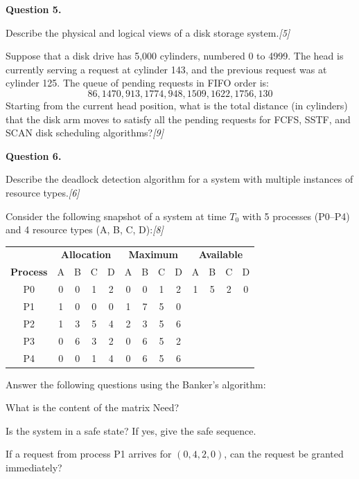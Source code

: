 \documentclass[11pt,a4paper]{article}
\newcommand{\pts}[1]{\hfill   \textit{[#1]}}
\begin{document}
\medskip


\noindent   \textbf{Question 5.}

\begin{parts}
  \item Describe the physical and logical views of a disk storage system.\pts{5}
  \item Suppose that a disk drive has 5,000 cylinders, numbered 0 to 4999. The head is currently serving a request at cylinder 143, and the previous request was at cylinder 125. The queue of pending requests in FIFO order is:
  \[ 86, 1470, 913, 1774, 948, 1509, 1622, 1756, 130 \]
  Starting from the current head position, what is the total distance (in cylinders) that the disk arm moves to satisfy all the pending requests for FCFS, SSTF, and SCAN disk scheduling algorithms?\pts{9}
\end{parts}

\medskip


\noindent   \textbf{Question 6.}

\begin{parts}
  \item Describe the deadlock detection algorithm for a system with multiple instances of resource types.\pts{6}
  \item Consider the following snapshot of a system at time $T_0$ with 5 processes (P0--P4) and 4 resource types (A, B, C, D):\pts{8}
  
\begin{center}
    
\begin{tabular}{|c|cccc|cccc|cccc|}
    \hline
    & \multicolumn{4}{c|}{   \textbf{Allocation}} & \multicolumn{4}{c|}{   \textbf{Maximum}} & \multicolumn{4}{c|}{   \textbf{Available}} \\
   \textbf{Process} & A & B & C & D & A & B & C & D & A & B & C & D \\
    \hline
    P0 & 0 & 0 & 1 & 2 & 0 & 0 & 1 & 2 & 1 & 5 & 2 & 0 \\
    P1 & 1 & 0 & 0 & 0 & 1 & 7 & 5 & 0 &   &   &   &   \\
    P2 & 1 & 3 & 5 & 4 & 2 & 3 & 5 & 6 &   &   &   &   \\
    P3 & 0 & 6 & 3 & 2 & 0 & 6 & 5 & 2 &   &   &   &   \\
    P4 & 0 & 0 & 1 & 4 & 0 & 6 & 5 & 6 &   &   &   &   \\
    \hline
    \end{tabular}
  \end{center}
  Answer the following questions using the Banker's algorithm:
  
\begin{parts}
    \item What is the content of the matrix Need?
    \item Is the system in a safe state? If yes, give the safe sequence.
    \item If a request from process P1 arrives for $(0, 4, 2, 0)$, can the request be granted immediately?
  \end{parts}
\end{parts}
\end{document}
